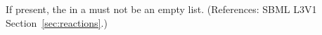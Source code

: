 If present, the \ListOfLocalParameters in a \KineticLaw must not
be an empty list.  (References: SBML L3V1 Section~\ref{sec:reactions}.)
